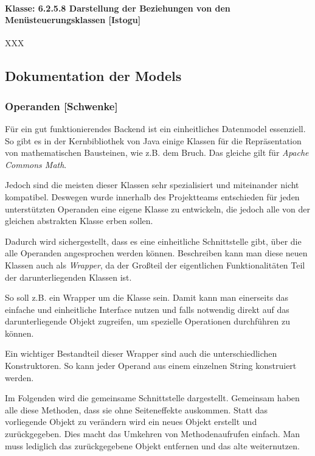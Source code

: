 \paragraph{Klasse: 6.2.5.8	Darstellung der Beziehungen von den Menüsteuerungsklassen [Istogu]}

XXX

\clearpage

\subsection{Dokumentation der Models }

\subsubsection{Operanden [Schwenke]}

Für ein gut funktionierendes Backend ist ein einheitliches Datenmodel essenziell. So gibt es in der Kernbibliothek von Java einige Klassen für die Repräsentation von mathematischen Bausteinen, wie z.B. dem Bruch. Das gleiche gilt für \textit{Apache Commons Math}. 

Jedoch sind die meisten dieser Klassen sehr spezialisiert und miteinander nicht kompatibel. Deswegen wurde innerhalb des Projektteams entschieden für jeden unterstützten Operanden eine eigene Klasse zu entwickeln, die jedoch alle von der gleichen abstrakten Klasse  erben sollen. 

Dadurch wird sichergestellt, dass es eine einheitliche Schnittstelle gibt, über die alle Operanden angesprochen werden können. Beschreiben kann man diese neuen Klassen auch als \textit{Wrapper}, da der Großteil der eigentlichen Funktionalitäten Teil der darunterliegenden Klassen ist. 

So soll z.B.  ein Wrapper um die Klasse  sein. Damit kann man einerseits das einfache und einheitliche Interface nutzen und falls notwendig direkt auf das darunterliegende Objekt zugreifen, um spezielle Operationen durchführen zu können. 

Ein wichtiger Bestandteil dieser Wrapper sind auch die unterschiedlichen Konstruktoren. So kann jeder Operand aus einem einzelnen String konstruiert werden. 

Im Folgenden wird die gemeinsame Schnittstelle dargestellt. Gemeinsam haben alle diese Methoden, dass sie ohne Seiteneffekte auskommen. Statt das vorliegende Objekt zu verändern wird ein neues Objekt erstellt und zurückgegeben. Dies macht das Umkehren von Methodenaufrufen einfach. Man muss lediglich das zurückgegebene Objekt entfernen und das alte weiternutzen.

